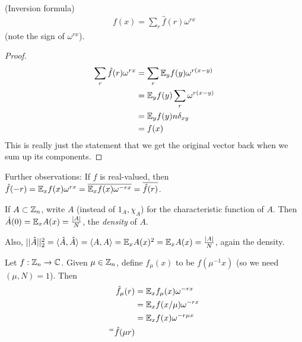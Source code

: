 \documentclass[a4paper]{article}
\begin{document}
\begin{lemma} (Inversion formula)\\
    \begin{equation*}
        \begin{aligned}
            f(x) = \sum_r \hat{f}(r) \omega^{rx}
        \end{aligned}
    \end{equation*}
    (note the sign of $\omega^{rx}$).
    \begin{proof}
        \begin{equation*}
            \begin{aligned}
                \sum_r \hat{f}(r) \omega^{rx} &= \sum_r \mathbb{E}_y f(y) \omega^{r(x-y)}\\
                &= \mathbb{E}_y f(y) \sum_r \omega^{r(x-y)}\\
                &= \mathbb{E}_y f(y) n\delta_{xy}\\
                &=f(x)
            \end{aligned}
        \end{equation*}
        This is really just the statement that we get the original vector back when we sum up its components.
    \end{proof}
\end{lemma}

Further observations: If $f$ is real-valued, then $\hat{f}(-r) = \mathbb{E}_x f(x) \omega^{rx} = \overline{\mathbb{E}_x f(x) \omega^{-rx}} = \overline{\hat{f}(r)}$.

If $A \subset \mathbb{Z}_n$, write $A$ (instead of $1_A,\chi_A$) for the characteristic function of $A$. Then $\hat{A}(0) = \mathbb{E}_x A(x) = \frac{|A|}{N}$, the \emph{density} of $A$.

Also, $||\hat{A}||^2_2 = \langle\hat{A},\hat{A}\rangle = \langle A,A\rangle = \mathbb{E}_x A(x)^2 = \mathbb{E}_x A(x) = \frac{|A|}{N}$, again the density.

Let $f:\mathbb{Z}_n \to \mathbb{C}$. Given $\mu \in \mathbb{Z}_n$, define $f_\mu(x)$ to be $f(\mu^{-1}x)$ (so we need $(\mu,N) = 1$). Then
\begin{equation*}
    \begin{aligned}
        \hat{f}_\mu(r) &= \mathbb{E}_x f_\mu (x) \omega^{-rx}\\
        &= \mathbb{E}_x f(x/\mu) \omega^{-rx}\\
        &=\mathbb{E}_x f(x) \omega^{-r\mu x}\\
        ^= \hat{f}(\mu r)
    \end{aligned}
\end{equation*}
\end{document}
